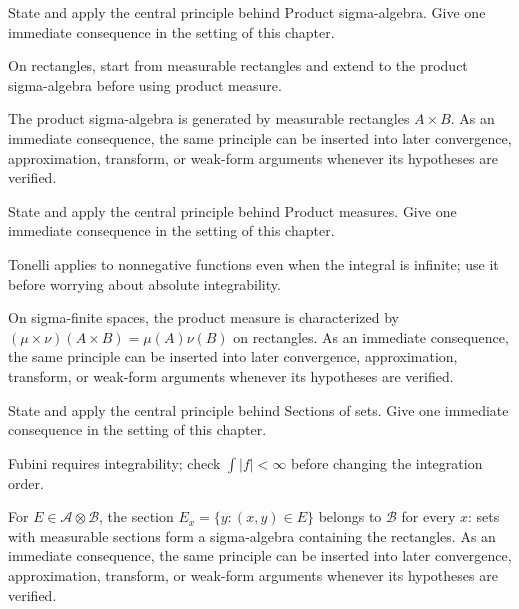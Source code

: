 \begin{exercise}\label{exr:iii05-01}
State and apply the central principle behind Product sigma-algebra. Give one immediate consequence in the setting of this chapter.
\end{exercise}
\begin{hint}
On rectangles, start from measurable rectangles and extend to the product sigma-algebra before using product measure.
\end{hint}
\begin{solution}
The product sigma-algebra is generated by measurable rectangles $A\times B$. As an immediate consequence, the same principle can be inserted into later convergence, approximation, transform, or weak-form arguments whenever its hypotheses are verified.
\end{solution}

\begin{exercise}\label{exr:iii05-02}
State and apply the central principle behind Product measures. Give one immediate consequence in the setting of this chapter.
\end{exercise}
\begin{hint}
Tonelli applies to nonnegative functions even when the integral is infinite; use it before worrying about absolute integrability.
\end{hint}
\begin{solution}
On sigma-finite spaces, the product measure is characterized by $(\mu\times\nu)(A\times B)=\mu(A)\nu(B)$ on rectangles. As an immediate consequence, the same principle can be inserted into later convergence, approximation, transform, or weak-form arguments whenever its hypotheses are verified.
\end{solution}

\begin{exercise}\label{exr:iii05-03}
State and apply the central principle behind Sections of sets. Give one immediate consequence in the setting of this chapter.
\end{exercise}
\begin{hint}
Fubini requires integrability; check \(\int |f|<\infty\) before changing the integration order.
\end{hint}
\begin{solution}
For $E\in\mathcal A\otimes\mathcal B$, the section $E_x=\{y:(x,y)\in E\}$ belongs to $\mathcal B$ for every $x$: sets with measurable sections form a sigma-algebra containing the rectangles. As an immediate consequence, the same principle can be inserted into later convergence, approximation, transform, or weak-form arguments whenever its hypotheses are verified.
\end{solution}

